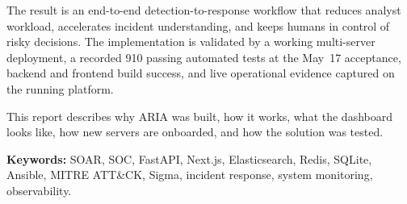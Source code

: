 The result is an end-to-end detection-to-response workflow that reduces analyst workload, accelerates incident understanding, and keeps humans in control of risky decisions. The implementation is validated by a working multi-server deployment, a recorded 910 passing automated tests at the May~17 acceptance, backend and frontend build success, and live operational evidence captured on the running platform.

This report describes why ARIA was built, how it works, what the dashboard looks like, how new servers are onboarded, and how the solution was tested.

\textbf{Keywords:} SOAR, SOC, FastAPI, Next.js, Elasticsearch, Redis, SQLite, Ansible, MITRE ATT\&CK, Sigma, incident response, system monitoring, observability.

